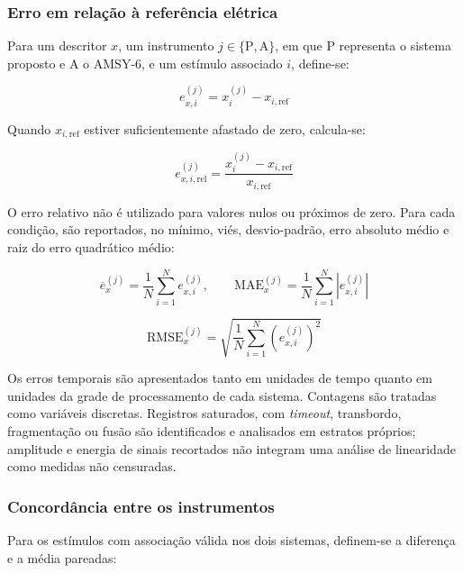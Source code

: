 \subsubsection{Erro em relação à referência elétrica}
Para um descritor \(x\), um instrumento \(j\in\{\mathrm{P},\mathrm{A}\}\), em que \(\mathrm{P}\) representa o sistema proposto e \(\mathrm{A}\) o AMSY-6, e um estímulo associado \(i\), define-se:

\begin{equation}
	e_{x,i}^{(j)} = x_i^{(j)} - x_{i,\mathrm{ref}}
	\label{v2:eq:erro_referencia_secao5}
\end{equation}

Quando \(x_{i,\mathrm{ref}}\) estiver suficientemente afastado de zero, calcula-se:

\begin{equation}
	e_{x,i,\mathrm{rel}}^{(j)} = \frac{x_i^{(j)} - x_{i,\mathrm{ref}}}{x_{i,\mathrm{ref}}}
	\label{v2:eq:erro_relativo_referencia_secao5}
\end{equation}

O erro relativo não é utilizado para valores nulos ou próximos de zero. Para cada condição, são reportados, no mínimo, viés, desvio-padrão, erro absoluto médio e raiz do erro quadrático médio:

\begin{equation}
	\overline{e}_x^{(j)} = \frac{1}{N} \sum_{i=1}^{N} e_{x,i}^{(j)}, \qquad \mathrm{MAE}_x^{(j)} = \frac{1}{N} \sum_{i=1}^{N} \left| e_{x,i}^{(j)} \right|
	\label{v2:eq:vies_mae_secao5}
\end{equation}

\begin{equation}
	\mathrm{RMSE}_x^{(j)} = \sqrt{\frac{1}{N} \sum_{i=1}^{N} \left(e_{x,i}^{(j)}\right)^2}
	\label{v2:eq:rmse_secao5}
\end{equation}

Os erros temporais são apresentados tanto em unidades de tempo quanto em unidades da grade de processamento de cada sistema. Contagens são tratadas como variáveis discretas. Registros saturados, com \textit{timeout}, transbordo, fragmentação ou fusão são identificados e analisados em estratos próprios; amplitude e energia de sinais recortados não integram uma análise de linearidade como medidas não censuradas.

\subsubsection{Concordância entre os instrumentos}
Para os estímulos com associação válida nos dois sistemas, definem-se a diferença e a média pareadas:


